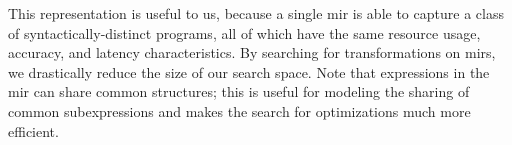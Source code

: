 
This representation is useful to us, because a single \gls{mir} is able to
capture a class of syntactically-distinct programs, all of which have the
same resource usage, accuracy, and latency characteristics.  By searching for
transformations on \glspl{mir}, we drastically reduce the size of our search
space.  Note that expressions in the \gls{mir} can share common structures;
this is useful for modeling the sharing of common subexpressions and makes the
search for optimizations much more efficient.


